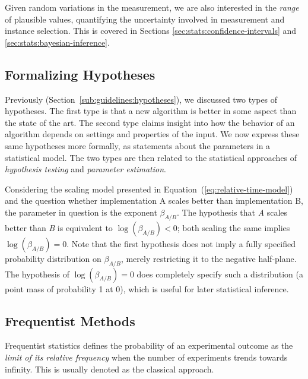\documentclass[algorithms,article,submit,moreauthors,pdftex]{Definitions/mdpi}
\newcounter{guideline}
\begin{document}
Given random variations in the measurement, we are also interested in the \emph{range} of plausible values, quantifying the uncertainty involved in measurement and instance selection.
This is covered in Sections \ref{sec:stats:confidence-intervals} and \ref{sec:stats:bayesian-inference}.

\subsection{Formalizing Hypotheses}
\label{ss:stats:hypotheses}
%
Previously (Section~\ref{sub:guidelines:hypotheses}), we discussed two types of hypotheses.
The first type is that a new algorithm is better in some aspect than the state of the art.
The second type claims insight into how the behavior of an algorithm depends on settings and properties of the input.
We now express these same hypotheses more formally, as statements about the parameters in a statistical model.
The two types are then related to the statistical approaches of \emph{hypothesis testing} and \emph{parameter estimation}.

Considering the scaling model presented in Equation~(\ref{eq:relative-time-model}) and the question whether implementation A scales better than implementation B,
the parameter in question is the exponent $\beta_{A/B}$.
The hypothesis that \emph{A} scales better than \emph{B} is equivalent to $\log(\beta_{A/B}) < 0$; both scaling the same implies $\log(\beta_{A/B}) = 0$.
Note that the first hypothesis does not imply a fully specified probability distribution on $\beta_{A/B}$, merely restricting it to the negative half-plane.
The hypothesis of $\log(\beta_{A/B}) = 0$ does completely specify such a distribution (\ie a point mass of probability 1 at 0), which is useful for later statistical inference.

\subsection{Frequentist Methods}
\label{sec:stats:frequentist}
%
Frequentist statistics defines the probability of an experimental outcome as the \emph{limit of its relative frequency}
when the number of experiments trends towards infinity.
This is usually denoted as the classical approach.
\end{document}
